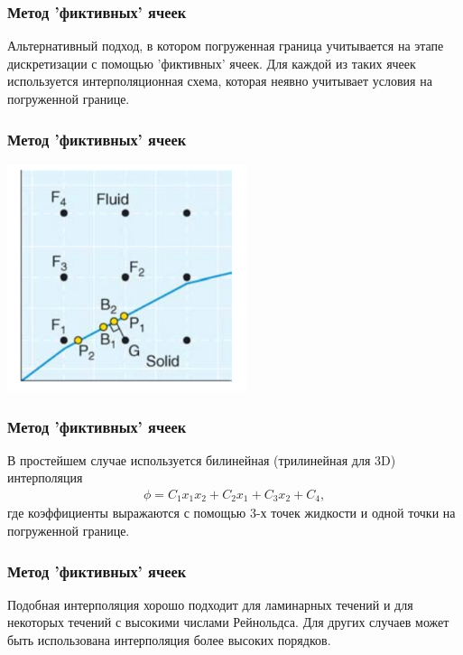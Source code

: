 \documentclass[14pt, notes]{beamer}
\begin{document}
\begin{frame}
\frametitle{Метод 'фиктивных' ячеек}
Альтернативный подход, в котором погруженная граница учитывается на этапе дискретизации с помощью 'фиктивных' ячеек.
Для каждой из таких ячеек используется интерполяционная схема, которая неявно учитывает условия на погруженной границе.
\end{frame}

\begin{frame}
\frametitle{Метод 'фиктивных' ячеек}
    \begin{center}
        \includegraphics[width=7cm]{immersed_boundary/ghost-cells.png}
    \end{center}
\end{frame}

\begin{frame}
\frametitle{Метод 'фиктивных' ячеек}
В простейшем случае используется билинейная (трилинейная для 3D) интерполяция
\begin{gather}
\label{eq:ghost_cell_iterpolation}
\phi = C_1 x_1 x_2 + C_2 x_1 + C_3 x_2 + C_4,
\end{gather}
где коэффициенты выражаются с помощью 3-х точек жидкости и одной точки на погруженной границе.
\end{frame}

\begin{frame}
\frametitle{Метод 'фиктивных' ячеек}
Подобная интерполяция хорошо подходит для ламинарных течений и для некоторых течений с высокими числами Рейнольдса.
Для других случаев может быть использована интерполяция более высоких порядков. 
\end{frame}
\end{document}
